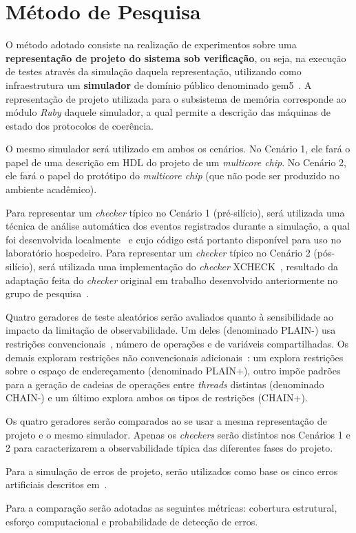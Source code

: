 \section{Método de Pesquisa}

O método adotado consiste na realização de experimentos sobre uma
\textbf{representação de projeto do sistema sob verificação}, ou seja, na
execução de testes através da simulação daquela representação, utilizando como
infraestrutura um \textbf{simulador} de domínio público denominado
gem5~\cite{Binkert:2011:GS:2024716.2024718}. A representação de projeto
utilizada para o subsistema de memória corresponde ao módulo \textit{Ruby}
daquele simulador, a qual permite a descrição das máquinas de estado dos
protocolos de coerência.

O mesmo simulador será utilizado em ambos os cenários. No Cenário 1, ele fará o
papel de uma descrição em HDL do projeto de um \textit{multicore chip}. No
Cenário 2, ele fará o papel do protótipo do \textit{multicore chip} (que não
pode ser produzido no ambiente acadêmico).

Para representar um \textit{checker} típico no Cenário 1 (pré-silício), será
utilizada uma técnica de análise automática dos eventos registrados durante a
simulação, a qual foi desenvolvida localmente~\cite{Freitas:2013} e cujo código
está portanto disponível para uso no laboratório hospedeiro. Para representar
um \textit{checker} típico no Cenário 2 (pós-silício), será utilizada uma
implementação do \textit{checker} XCHECK~\cite{Hu:2012}, resultado da adaptação
feita do \textit{checker} original em trabalho desenvolvido anteriormente no
grupo de pesquisa~\cite{Andrade:2016}.

Quatro geradores de teste aleatórios serão avaliados quanto à sensibilidade ao
impacto da limitação de observabilidade. Um deles (denominado PLAIN-) usa
restrições convencionais~\cite{Rambo:2011}, número de operações e de variáveis
compartilhadas. Os demais exploram restrições não convencionais
adicionais~\cite{Andrade:2017}: um explora restrições sobre o espaço de
endereçamento (denominado PLAIN+), outro impõe padrões para a geração de
cadeias de operações entre \textit{threads} distintas (denominado CHAIN-) e um
último explora ambos os tipos de restrições (CHAIN+).

Os quatro geradores serão comparados ao se usar a mesma representação de
projeto e o mesmo simulador. Apenas os \textit{checkers} serão distintos nos
Cenários 1 e 2 para caracterizarem a observabilidade típica das diferentes
fases do projeto.

Para a simulação de erros de projeto, serão utilizados como base os cinco erros
artificiais descritos em~\cite{Andrade:2017}.

Para a comparação serão adotadas as seguintes métricas: cobertura estrutural,
esforço computacional e probabilidade de detecção de erros.

